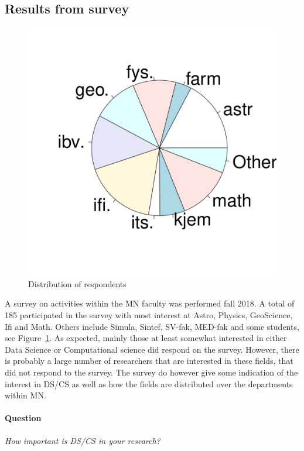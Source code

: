 \documentclass[a4paper,10pt]{article}
\begin{document}
\subsection{Results from survey}
\begin{figure}
\centering
\includegraphics[scale=0.3,trim={0.5cm 2.7cm 0cm 2.4cm},clip]{pie_dept.pdf}
\caption{\label{fig:deptdistr}Distribution of respondents }
\end{figure}
A survey on activities within the MN faculty was performed fall 2018. A total of 185 participated in the survey with most interest at Astro, Physics, GeoScience, Ifi and Math.
Others include Simula, Sintef, SV-fak, MED-fak and some students, see Figure~\ref{fig:deptdistr}. As expected, mainly those at least somewhat interested in either Data Science or Computational science did respond on the survey. However, there is probably a large number of researchers that are interested in these fields, that did not respond to the survey. The survey do however give some indication of the interest in DS/CS as well as how the fields are distributed over the departments within MN. 


\paragraph{Question} \textit{How important is DS/CS in your research?}\\
\end{document}
